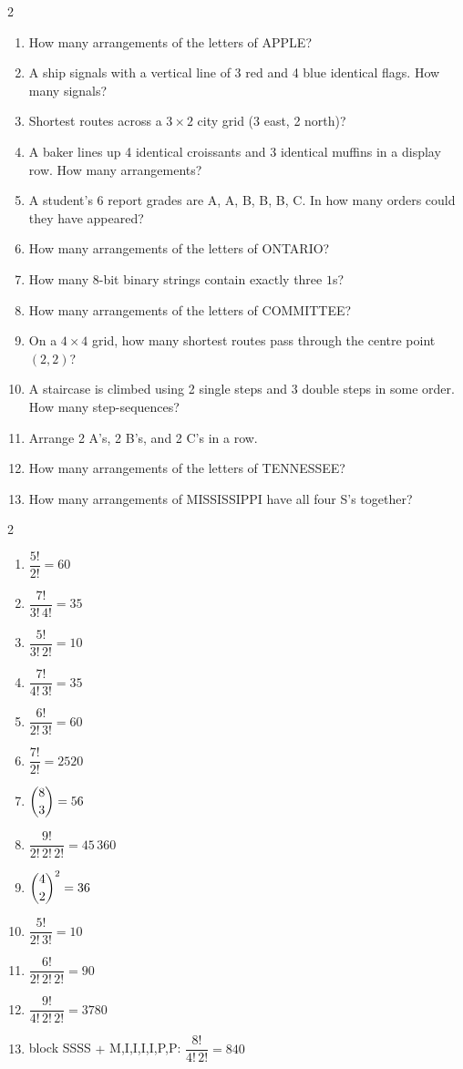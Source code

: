 \documentclass[11pt]{article}
\begin{document}
\clearpage
{}

\begin{recapbox}
\begin{multicols}{2}
\small
\begin{enumerate}[leftmargin=*,itemsep=3pt]
  \item How many arrangements of the letters of APPLE?
  \item A ship signals with a vertical line of 3 red and 4 blue identical flags. How many signals?
  \item Shortest routes across a $3\times2$ city grid (3 east, 2 north)?
  \item A baker lines up 4 identical croissants and 3 identical muffins in a display row. How many arrangements?
  \item A student's 6 report grades are A, A, B, B, B, C. In how many orders could they have appeared?
  \item How many arrangements of the letters of ONTARIO?
  \item How many 8-bit binary strings contain exactly three $1$s?
  \item How many arrangements of the letters of COMMITTEE?
  \item On a $4\times4$ grid, how many shortest routes pass through the centre point $(2,2)$?
  \item A staircase is climbed using 2 single steps and 3 double steps in some order. How many step-sequences?
  \item Arrange 2 A's, 2 B's, and 2 C's in a row.
  \item How many arrangements of the letters of TENNESSEE?
  \item How many arrangements of MISSISSIPPI have all four S's together?
\end{enumerate}
\end{multicols}
\end{recapbox}

\begin{keybox}
\begin{multicols}{2}
\small
\begin{enumerate}[leftmargin=*,itemsep=3pt]
  \item $\dfrac{5!}{2!}=60$
  \item $\dfrac{7!}{3!\,4!}=35$
  \item $\dfrac{5!}{3!\,2!}=10$
  \item $\dfrac{7!}{4!\,3!}=35$
  \item $\dfrac{6!}{2!\,3!}=60$
  \item $\dfrac{7!}{2!}=2520$
  \item $\dbinom{8}{3}=56$
  \item $\dfrac{9!}{2!\,2!\,2!}=45\,360$
  \item $\dbinom{4}{2}^2=36$
  \item $\dfrac{5!}{2!\,3!}=10$
  \item $\dfrac{6!}{2!\,2!\,2!}=90$
  \item $\dfrac{9!}{4!\,2!\,2!}=3780$
  \item block SSSS $+$ M,I,I,I,I,P,P: $\dfrac{8!}{4!\,2!}=840$
\end{enumerate}
\end{multicols}
\end{keybox}
\end{document}
